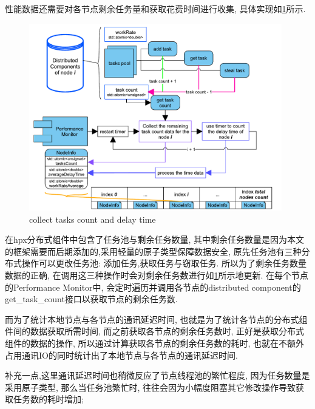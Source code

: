\documentclass{mproj}
\begin{document}
性能数据还需要对各节点剩余任务量和获取花费时间进行收集,
具体实现如\cref{fig:tasks_detection}所示.

\begin{figure}[h]
    \centering %
    \includegraphics[width=0.98\textwidth]{images/tasks_detection.pdf} %
    \caption{collect tasks count and delay time} %
    \label{fig:tasks_detection} %
\end{figure}
\FloatBarrier

在hpx分布式组件中包含了任务池与剩余任务数量,
其中剩余任务数量是因为本文的框架需要而后期添加的,采用轻量的原子类型保障数据安全,
原先任务池有三种分布式操作可以更改任务池:
添加任务,获取任务与窃取任务.
所以为了剩余任务数量数据的正确,
在调用这三种操作时会对剩余任务数进行如\cref{fig:tasks_detection}所示地更新.
在每个节点的Performance Monitor中,
会定时遍历并调用各节点的distributed component的get\_task\_count接口以获取节点的剩余任务数.

而为了统计本地节点与各节点的通讯延迟时间,
也就是为了统计各节点的分布式组件间的数据获取所需时间,
而之前获取各节点的剩余任务数时,
正好是获取分布式组件的数据的操作,
所以通过计算获取各节点的剩余任务数的耗时,
也就在不额外占用通讯IO的同时统计出了本地节点与各节点的通讯延迟时间.

补充一点,这里通讯延迟时间也稍微反应了节点线程池的繁忙程度,
因为任务数量是采用原子类型,
那么当任务池繁忙时,
往往会因为小幅度阻塞其它修改操作导致获取任务数的耗时增加;
\end{document}
